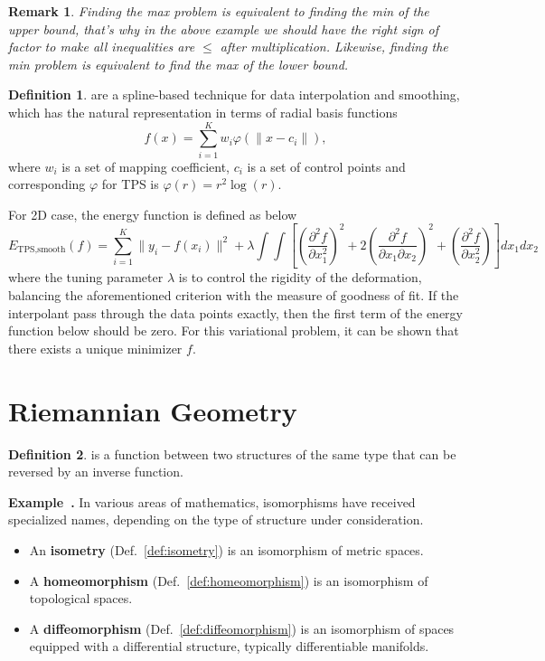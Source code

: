 \documentclass[a4paper]{article}
\theoremstyle{definition}
\newtheorem{definition}{Definition}
\theoremstyle{plain}
\newtheorem{remark}{Remark}
\newenvironment{example}[1][]{\refstepcounter{example}\par\medskip
   \noindent \textbf{Example~\theexample. #1} \rmfamily}{\medskip}
\newcounter{example}{Example}
\begin{document}
\begin{remark}
Finding the max problem is equivalent to finding the min of the upper bound, that's why in the above example we should have the right sign of factor to make all inequalities are $\le$ after multiplication. Likewise, finding the min problem is equivalent to find the max of the lower bound.
\end{remark}

\begin{definition}
 are a spline-based technique for data interpolation and smoothing, which has the natural representation in terms of radial basis functions
\begin{equation*}
    f(x)=\sum^K_{i=1}w_i\varphi(\|x-c_i\|),
\end{equation*}
where $w_i$ is a set of mapping coefficient, $c_i$ is a set of control points and corresponding $\varphi$ for TPS is $\varphi(r)=r^2\log(r)$.

For 2D case, the energy function is defined as below
\begin{equation*}
    E_{\text{TPS},\text{smooth}}(f)=\sum^K_{i=1}\|y_i-f(x_i)\|^2+\lambda\int\int\left[\left(\frac{\partial^2 f}{\partial x^2_1}\right)^2+2\left(\frac{\partial^2f}{\partial x_1\partial x_2}\right)^2+\left(\frac{\partial^2f}{\partial x_2^2}\right)\right]dx_1dx_2
\end{equation*}
where the tuning parameter $\lambda$ is to control the rigidity of the deformation, balancing the aforementioned criterion with the measure of goodness of fit. If the interpolant pass through the data points exactly, then the first term of the energy function below should be zero. For this variational problem, it can be shown that there exists a unique minimizer $f$.
\end{definition}

\newpage
\section{Riemannian Geometry\cite{fletcher,hao,zhang}}
\begin{definition}
 is a function between two structures of the same type that can be reversed by an inverse function.
\end{definition}

\begin{example}
In various areas of mathematics, isomorphisms have received specialized names, depending on the type of structure under consideration.
\begin{itemize}
    \item An \textbf{isometry} (Def.~\ref{def:isometry}) is an isomorphism of metric spaces.
    \item A \textbf{homeomorphism} (Def.~\ref{def:homeomorphism}) is an isomorphism of topological spaces.
    \item A \textbf{diffeomorphism} (Def.~\ref{def:diffeomorphism}) is an isomorphism of spaces equipped with a differential structure, typically differentiable manifolds.
\end{itemize}
\end{example}
\end{document}
